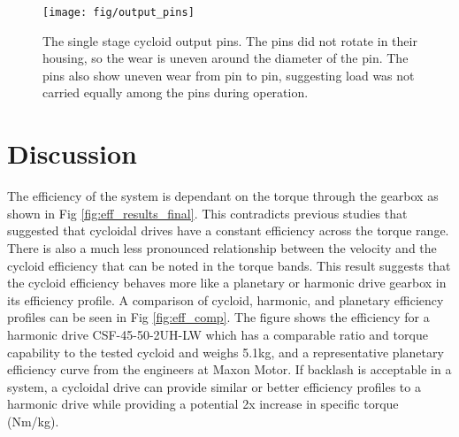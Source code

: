 \begin{figure}[t]
   \centering
   \texttt{[image: fig/output\_pins]}
   \caption{The single stage cycloid output pins. The pins did not rotate in their housing, so the wear is uneven around the diameter of the pin. The pins also show uneven wear from pin to pin, suggesting load was not carried equally among the pins during operation.}
   \label{fig:single_output_pins}
\end{figure}

\section{Discussion} \label{ch:single:discussion}

The efficiency of the system is dependant on the torque through the gearbox as shown in Fig \ref{fig:eff_results_final}.
This contradicts previous studies that suggested that cycloidal drives have a constant efficiency across the torque range.
There is also a much less pronounced relationship between the velocity and the cycloid efficiency that can be noted in the torque bands.
This result suggests that the cycloid efficiency behaves more like a planetary or harmonic drive gearbox in its efficiency profile.
A comparison of cycloid, harmonic, and planetary efficiency profiles can be seen in Fig \ref{fig:eff_comp}.
The figure shows the efficiency for a harmonic drive CSF-45-50-2UH-LW \cite{ref:harmonic_sheet} which has a comparable ratio and torque capability to the tested cycloid and weighs 5.1kg, and a representative planetary efficiency curve from the engineers at Maxon Motor.
If backlash is acceptable in a system, a cycloidal drive can provide similar or better efficiency profiles to a harmonic drive while providing a potential 2x increase in specific torque (Nm/kg).

